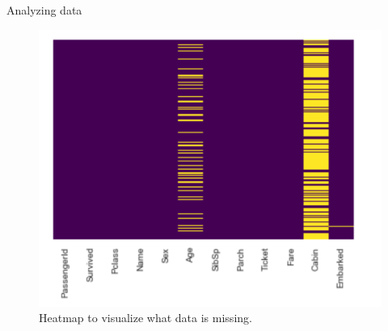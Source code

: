 \documentclass[a4paper,12pt]{article}
\begin{document}
\begin{section}{Analyzing data}
\begin{figure}
  \includegraphics[width=\textwidth]{heatmap.png}
	\caption{Heatmap to visualize what data is missing.}
\end{figure}


\end{section}
\end{document}
